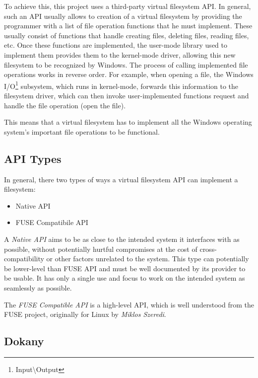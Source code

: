 To achieve this, this project uses a third-party virtual filesystem API. In general, such an API usually allows to creation of a virtual filesystem by providing the programmer with a list of file operation functions that he must implement. These usually consist of functions that handle creating files, deleting files, reading files, etc. Once these functions are implemented, the user-mode library used to implement them provides them to the kernel-mode driver, allowing this new filesystem to be recognized by Windows. The process of calling implemented file operations works in reverse order. For example, when opening a file, the Windows I/O\footnote{Input\textbackslash{}Output} subsystem, which runs in kernel-mode, forwards this information to the filesystem driver, which can then invoke user-implemented functions request and handle the file operation (open the file).\cite{GitDokany}

This means that a virtual filesystem has to implement all the Windows operating system's important file operations to be functional.

\subsection*{API Types}
\label{vfsapitypes}
In general, there two types of ways a virtual filesystem API can implement a filesystem:

\begin{itemize}
    \item Native API
    \item FUSE Compatibile API
\end{itemize}

A \textit{Native API} aims to be as close to the intended system it interfaces with as possible, without potentially hurtful compromises at the cost of cross-compatibility or other factors unrelated to the system. This type can potentially be lower-level than FUSE API and must be well documented by its provider to be usable. It has only a single use and focus to work on the intended system as seamlessly as possible.

The \textit{FUSE Compatible API} is a high-level API, which is well understood from the FUSE project, originally for Linux by \textit{Miklos Szeredi}.\cite{WinFspVSFUSE}\cite{FUSE}

\subsection*{Dokany}
\cite{GitDokany}


